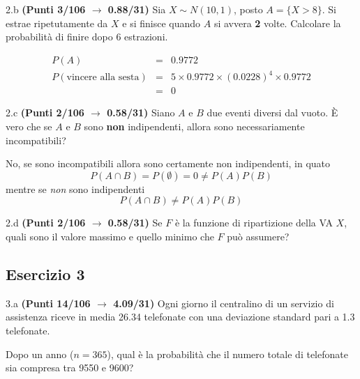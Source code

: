 \documentclass[
  11pt,
]{book}
\theoremstyle{mytheoremstyle}
\theoremstyle{mydefstyle}
\newenvironment{sol}
  {
  \begin{tcolorbox}[enhanced,breakable,arc=0.1mm,boxrule=1pt,colback=white,colframe=iblue,
  title=\bf \fontfamily{lmss}\selectfont \hspace{.5 cm} Soluzione,drop fuzzy shadow]

}{
\end{tcolorbox}
  }
\begin{document}
2.b \textbf{(Punti 3/106 \(\rightarrow\) 0.88/31)} Sia \(X\sim N(10,1)\), posto \(A=\{X>8\}\). Si estrae ripetutamente da \(X\) e si finisce quando \(A\) si avvera \textbf{2} volte. Calcolare la probabilità di finire dopo 6 estrazioni.

\begin{sol}
\begin{eqnarray*}
P(A)&=&0.9772\\
P(\text{vincere alla sesta})&=&5\times0.9772\times (0.0228)^4\times 0.9772\\
&=& 0
\end{eqnarray*}

\end{sol}

2.c \textbf{(Punti 2/106 \(\rightarrow\) 0.58/31)} Siano \(A\) e \(B\) due eventi diversi dal vuoto. È vero che se \(A\) e \(B\) sono
\textbf{non} indipendenti, allora sono necessariamente incompatibili?

\begin{sol}
No, se sono incompatibili allora sono certamente non indipendenti, in quato
\[
P(A\cap B)=P(\emptyset)=0\ne P(A)P(B)
\]
mentre se \emph{non} sono indipendenti
\[
P(A\cap B)\ne P(A)P(B)
\]

\end{sol}

2.d \textbf{(Punti 2/106 \(\rightarrow\) 0.58/31)} Se \(F\) è la funzione di ripartizione della VA \(X\),
quali sono il valore massimo e quello minimo che \(F\) può assumere?

\subsection{Esercizio 3}\label{esercizio-3-12}

3.a \textbf{(Punti 14/106 \(\rightarrow\) 4.09/31)} Ogni giorno il centralino di un servizio di assistenza riceve in media 26.34 telefonate con una deviazione standard pari a 1.3 telefonate.

Dopo un anno (\(n=365\)), qual è la probabilità che il numero totale di telefonate sia compresa tra 9550 e 9600?
\end{document}
